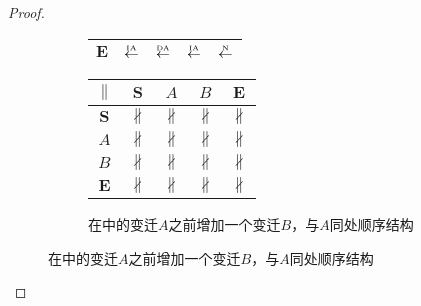 \begin{proof}
\begin{figure}[htbp]
\begin{subfigure}{1\textwidth}
\begin{minipage}[b]{0.3\textwidth}
\begin{tabular}{|c|c|c|c|c|}
        $\bm{E}$ & $\overset{\text{\tiny{IA}}}{\leftarrow}$ & $\overset{\text{\tiny{DA}}}{\leftarrow}$ & $\overset{\text{\tiny{IA}}}{\leftarrow}$ & $\overset{\text{\tiny{N}}}{\leftarrow}$\\ \hline
      \end{tabular}
    \end{minipage}
    \begin{minipage}[b]{0.3\textwidth}
      \vspace{1em}
      \centering
      \begin{tabular}{|c|c|c|c|c|} \hline
        $\parallel$ & $\bm{S}$ & $A$ & $B$ & $\bm{E}$\\ \hline
        $\bm{S}$ & $\nparallel$ & $\nparallel$ & $\nparallel$ & $\nparallel$\\ \hline
        $A$ & $\nparallel$ & $\nparallel$ & $\nparallel$ & $\nparallel$\\ \hline
        $B$ & $\nparallel$ & $\nparallel$ & $\nparallel$ & $\nparallel$\\ \hline
        $\bm{E}$ & $\nparallel$ & $\nparallel$ & $\nparallel$ & $\nparallel$\\ \hline
      \end{tabular}
    \end{minipage}
    \caption{在中的变迁$A$之前增加一个变迁$B$，与$A$同处顺序结构}
    \label{fig:uniqueness_2_c}
  \end{subfigure}


\end{figure}
\end{proof}
